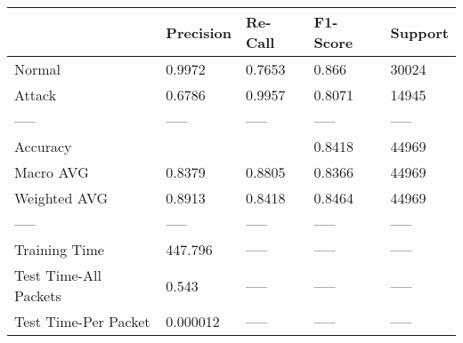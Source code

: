 \begin{tabular}{lllll}
\toprule
{} & Precision & Re-Call & F1-Score & Support \\
\midrule
Normal                &    0.9972 &  0.7653 &    0.866 &   30024 \\
Attack                &    0.6786 &  0.9957 &   0.8071 &   14945 \\
-----                 &     ----- &   ----- &    ----- &   ----- \\
Accuracy              &           &         &   0.8418 &   44969 \\
Macro AVG             &    0.8379 &  0.8805 &   0.8366 &   44969 \\
Weighted AVG          &    0.8913 &  0.8418 &   0.8464 &   44969 \\
-----                 &     ----- &   ----- &    ----- &   ----- \\
Training Time         &   447.796 &   ----- &    ----- &   ----- \\
Test Time-All Packets &     0.543 &   ----- &    ----- &   ----- \\
Test Time-Per Packet  &  0.000012 &   ----- &    ----- &   ----- \\
\bottomrule
\end{tabular}
